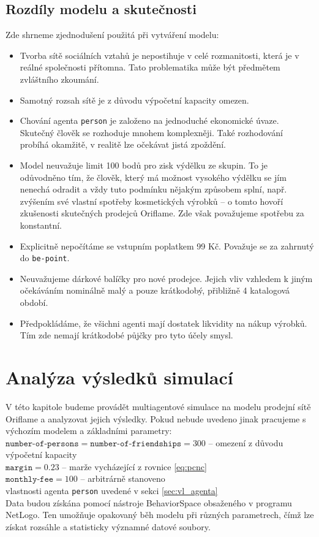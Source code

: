 \documentclass[a4wide,12pt]{report}
\begin{document}
\section{Rozdíly modelu a skutečnosti}
Zde shrneme zjednodušení použitá při vytváření modelu:
\begin{itemize}
\item Tvorba sítě sociálních vztahů je nepostihuje v celé rozmanitosti, která je v reálné společnosti přítomna. Tato problematika může být předmětem zvláštního zkoumání.
\item Samotný rozsah sítě je z důvodu výpočetní kapacity omezen.
\item Chování agenta \texttt{person} je založeno na jednoduché ekonomické úvaze. Skutečný člověk se rozhoduje mnohem komplexněji. Také rozhodování probíhá okamžitě, v realitě lze očekávat jistá zpoždění.
\item Model neuvažuje limit 100 bodů pro zisk výdělku ze skupin. To je odůvodněno tím, že člověk, který má možnost vysokého výdělku se jím nenechá odradit a vždy tuto podmínku nějakým způsobem splní, např. zvýšením své vlastní spotřeby kosmetických výrobků -- o tomto hovoří zkušenosti skutečných prodejců Oriflame. Zde však považujeme spotřebu za konstantní.
\item Explicitně nepočítáme se vstupním poplatkem 99 Kč. Považuje se za zahrnutý do \texttt{be-point}.
\item Neuvažujeme dárkové balíčky pro nové prodejce. Jejich vliv vzhledem k jiným očekáváním nominálně malý a pouze krátkodobý, přibližně 4 katalogová období.
\item Předpokládáme, že všichni agenti mají dostatek likvidity na nákup výrobků. Tím zde nemají krátkodobé půjčky pro tyto účely smysl.
\end{itemize}
%
%
%
\chapter{Analýza výsledků simulací}
V této kapitole budeme provádět multiagentové simulace na modelu prodejní sítě Oriflame a analyzovat jejich výsledky. Pokud nebude uvedeno jinak pracujeme s výchozím modelem a základními parametry:\\[3mm]
$\texttt{number-of-persons}=\texttt{number-of-friendships}=300$ -- omezení z důvodu výpočetní kapacity\\
$\texttt{margin}=0.23$ -- marže vycházející z rovnice \ref{eq:pcnc}\\
$\texttt{monthly-fee}=100$ -- arbitrárně stanoveno\\
vlastnosti agenta \texttt{person} uvedené v sekci \ref{sec:vl_agenta}\\[3mm]
Data budou získána pomocí nástroje BehaviorSpace obsaženého v programu NetLogo. Ten umožňuje opakovaný běh modelu při různých parametrech, čímž lze získat rozsáhle a statisticky významné datové soubory.
\end{document}
